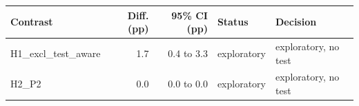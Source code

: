 \begin{tabular}{lrrll}
\toprule
Contrast & Diff. (pp) & 95\% CI (pp) & Status & Decision \\
\midrule
H1\_excl\_test\_aware & 1.7 & 0.4 to 3.3 & exploratory & exploratory, no test \\
H2\_P2 & 0.0 & 0.0 to 0.0 & exploratory & exploratory, no test \\
\bottomrule
\end{tabular}

